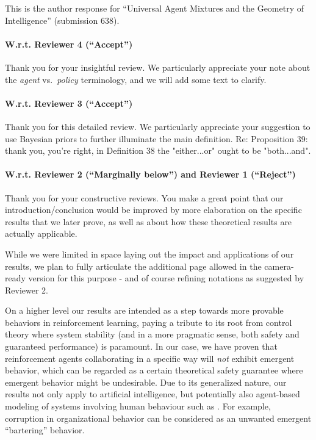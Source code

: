 \documentclass{article}
\begin{document}
This is the author response for ``Universal Agent Mixtures and the Geometry of Intelligence''
(submission 638).

\paragraph{W.r.t. Reviewer 4 (``Accept'')}

Thank you for your insightful review. We particularly appreciate your note about the \emph{agent} vs.\ \emph{policy} terminology, and we will add some text to clarify.

\paragraph{W.r.t. Reviewer 3 (``Accept'')}

Thank you for this detailed review. We particularly appreciate your suggestion to use Bayesian priors to further illuminate the main definition. Re: Proposition 39: thank you, you're right, in Definition 38 the "either...or" ought to be "both...and".

\paragraph{W.r.t. Reviewer 2 (``Marginally below'') and Reviewer 1 (``Reject'')}

Thank you for your constructive reviews. You make a great point that our introduction/conclusion would
be improved by more elaboration on the specific results that we later prove, as well as
about how these theoretical results are actually applicable.

While we were limited in space laying out the impact and
applications
of our results, we plan to fully articulate the additional page
allowed in the camera-ready version for this purpose - and of course refining notations as suggested by Reviewer 2.

On a higher level our results are intended as a step towards more provable behaviors in reinforcement learning,
paying a tribute to its root from control theory where system stability (and in a more pragmatic sense,
both safety and guaranteed performance)
is paramount.
In our case, we have proven that reinforcement agents collaborating
in a specific way will \emph{not} exhibit emergent behavior, which
can be regarded as a certain theoretical safety guarantee where emergent behavior might be undesirable.
Due to its generalized nature, our results not only apply to artificial intelligence,
but potentially also agent-based modeling of
systems involving human behaviour such as \cite{Bouarfa2013AgentbasedMA}.
For example, corruption in organizational behavior can be considered as an unwanted emergent ``bartering'' behavior. 
\end{document}
